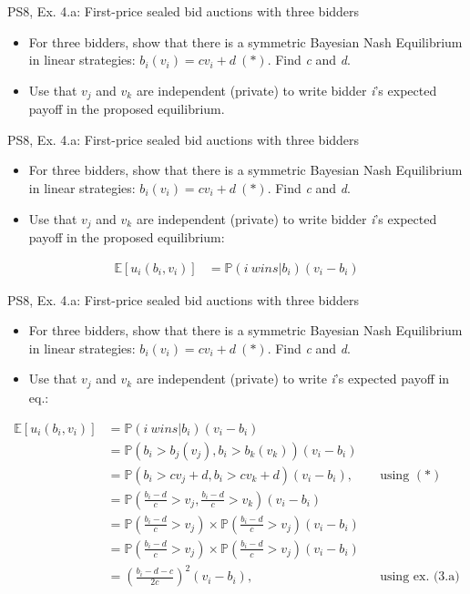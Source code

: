 \begin{frame}{PS8, Ex. 4.a: First-price sealed bid auctions with three bidders}
    \begin{itemize}
      \item[(a)] For three bidders, show that there is a symmetric Bayesian Nash Equilibrium in linear strategies: $b_i(v_i) = cv_i + d\ (*)$. Find \textit{c} and \textit{d}.
      \item[Hint:] Use that $v_j$ and $v_k$ are independent (private) to write bidder \textit{i}'s expected payoff in the proposed equilibrium.
    \end{itemize}
    \vfill\null
\end{frame}
\begin{frame}{PS8, Ex. 4.a: First-price sealed bid auctions with three bidders}
    \begin{itemize}
      \item[(a)] For three bidders, show that there is a symmetric Bayesian Nash Equilibrium in linear strategies: $b_i(v_i) = cv_i + d\ (*)$. Find \textit{c} and \textit{d}.
      \item[Hint:] Use that $v_j$ and $v_k$ are independent (private) to write bidder \textit{i}'s expected payoff in the proposed equilibrium:
    \end{itemize}
    \vspace{-10pt}
    \begin{align*}
      \mathbb{E}[u_i(b_i,v_i)]
      &=\mathbb{P}(i\ wins|b_i)(v_i-b_i)
    \end{align*}
    \vfill\null
\end{frame}
\begin{frame}{PS8, Ex. 4.a: First-price sealed bid auctions with three bidders}
    \begin{itemize}
      \item[(a)] For three bidders, show that there is a symmetric Bayesian Nash Equilibrium in linear strategies: $b_i(v_i) = cv_i + d\ (*)$. Find \textit{c} and \textit{d}.
      \item[Hint:] Use that $v_j$ and $v_k$ are independent (private) to write \textit{i}'s expected payoff in eq.:
    \end{itemize}
    \vspace{-10pt}
    \begin{align*}
      \mathbb{E}[u_i(b_i,v_i)]
      &=\mathbb{P}(i\ wins|b_i)(v_i-b_i)\\
      &=\mathbb{P}\left(b_i>b_j(v_j),b_i>b_k(v_k)\right)(v_i-b_i)\\
      &=\mathbb{P}(b_i>cv_j+d,b_i>cv_k+d)(v_i-b_i),&&\text{using }(*)\\
      &=\mathbb{P}\left(\frac{b_i-d}{c}>v_j,\frac{b_i-d}{c}>v_k\right)(v_i-b_i)\\
      &=\mathbb{P}\left(\frac{b_i-d}{c}>v_j\right)\times\mathbb{P}\left(\frac{b_i-d}{c}>v_j\right)(v_i-b_i)\\
      &=\mathbb{P}\left(\frac{b_i-d}{c}>v_j\right)\times\mathbb{P}\left(\frac{b_i-d}{c}>v_j\right)(v_i-b_i)\\
      &=\left(\frac{b_i-d-c}{2c}\right)^2(v_i-b_i),&&\text{using ex. (3.a)}
    \end{align*}
    \vfill\null
\end{frame}
